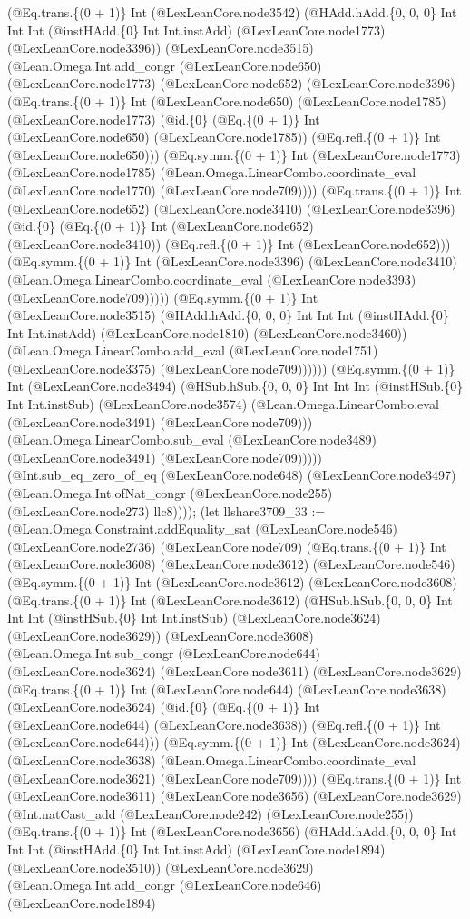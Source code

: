 \documentclass[11pt]{article}
\begin{document}
(@Eq.trans.\{(0 + 1)\} Int (@LexLeanCore.node3542) (@HAdd.hAdd.\{0, 0, 0\} Int Int Int (@instHAdd.\{0\} Int Int.instAdd) (@LexLeanCore.node1773) (@LexLeanCore.node3396)) (@LexLeanCore.node3515) (@Lean.Omega.Int.add\_congr (@LexLeanCore.node650) (@LexLeanCore.node1773) (@LexLeanCore.node652) (@LexLeanCore.node3396) (@Eq.trans.\{(0 + 1)\} Int (@LexLeanCore.node650) (@LexLeanCore.node1785) (@LexLeanCore.node1773) (@id.\{0\} (@Eq.\{(0 + 1)\} Int (@LexLeanCore.node650) (@LexLeanCore.node1785)) (@Eq.refl.\{(0 + 1)\} Int (@LexLeanCore.node650))) (@Eq.symm.\{(0 + 1)\} Int (@LexLeanCore.node1773) (@LexLeanCore.node1785) (@Lean.Omega.LinearCombo.coordinate\_eval (@LexLeanCore.node1770) (@LexLeanCore.node709)))) (@Eq.trans.\{(0 + 1)\} Int (@LexLeanCore.node652) (@LexLeanCore.node3410) (@LexLeanCore.node3396) (@id.\{0\} (@Eq.\{(0 + 1)\} Int (@LexLeanCore.node652) (@LexLeanCore.node3410)) (@Eq.refl.\{(0 + 1)\} Int (@LexLeanCore.node652))) (@Eq.symm.\{(0 + 1)\} Int (@LexLeanCore.node3396) (@LexLeanCore.node3410) (@Lean.Omega.LinearCombo.coordinate\_eval (@LexLeanCore.node3393) (@LexLeanCore.node709))))) (@Eq.symm.\{(0 + 1)\} Int (@LexLeanCore.node3515) (@HAdd.hAdd.\{0, 0, 0\} Int Int Int (@instHAdd.\{0\} Int Int.instAdd) (@LexLeanCore.node1810) (@LexLeanCore.node3460)) (@Lean.Omega.LinearCombo.add\_eval (@LexLeanCore.node1751) (@LexLeanCore.node3375) (@LexLeanCore.node709)))))) (@Eq.symm.\{(0 + 1)\} Int (@LexLeanCore.node3494) (@HSub.hSub.\{0, 0, 0\} Int Int Int (@instHSub.\{0\} Int Int.instSub) (@LexLeanCore.node3574) (@Lean.Omega.LinearCombo.eval (@LexLeanCore.node3491) (@LexLeanCore.node709))) (@Lean.Omega.LinearCombo.sub\_eval (@LexLeanCore.node3489) (@LexLeanCore.node3491) (@LexLeanCore.node709))))) (@Int.sub\_eq\_zero\_of\_eq (@LexLeanCore.node648) (@LexLeanCore.node3497) (@Lean.Omega.Int.ofNat\_congr (@LexLeanCore.node255) (@LexLeanCore.node273) llc8)))); (let llshare3709\_33 := (@Lean.Omega.Constraint.addEquality\_sat (@LexLeanCore.node546) (@LexLeanCore.node2736) (@LexLeanCore.node709) (@Eq.trans.\{(0 + 1)\} Int (@LexLeanCore.node3608) (@LexLeanCore.node3612) (@LexLeanCore.node546) (@Eq.symm.\{(0 + 1)\} Int (@LexLeanCore.node3612) (@LexLeanCore.node3608) (@Eq.trans.\{(0 + 1)\} Int (@LexLeanCore.node3612) (@HSub.hSub.\{0, 0, 0\} Int Int Int (@instHSub.\{0\} Int Int.instSub) (@LexLeanCore.node3624) (@LexLeanCore.node3629)) (@LexLeanCore.node3608) (@Lean.Omega.Int.sub\_congr (@LexLeanCore.node644) (@LexLeanCore.node3624) (@LexLeanCore.node3611) (@LexLeanCore.node3629) (@Eq.trans.\{(0 + 1)\} Int (@LexLeanCore.node644) (@LexLeanCore.node3638) (@LexLeanCore.node3624) (@id.\{0\} (@Eq.\{(0 + 1)\} Int (@LexLeanCore.node644) (@LexLeanCore.node3638)) (@Eq.refl.\{(0 + 1)\} Int (@LexLeanCore.node644))) (@Eq.symm.\{(0 + 1)\} Int (@LexLeanCore.node3624) (@LexLeanCore.node3638) (@Lean.Omega.LinearCombo.coordinate\_eval (@LexLeanCore.node3621) (@LexLeanCore.node709)))) (@Eq.trans.\{(0 + 1)\} Int (@LexLeanCore.node3611) (@LexLeanCore.node3656) (@LexLeanCore.node3629) (@Int.natCast\_add (@LexLeanCore.node242) (@LexLeanCore.node255)) (@Eq.trans.\{(0 + 1)\} Int (@LexLeanCore.node3656) (@HAdd.hAdd.\{0, 0, 0\} Int Int Int (@instHAdd.\{0\} Int Int.instAdd) (@LexLeanCore.node1894) (@LexLeanCore.node3510)) (@LexLeanCore.node3629) (@Lean.Omega.Int.add\_congr (@LexLeanCore.node646) (@LexLeanCore.node1894) 
\end{document}
